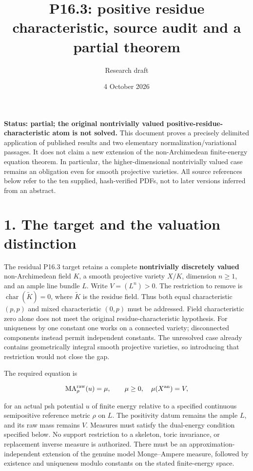 \documentclass[
  11pt,
]{article}
\title{P16.3: positive residue characteristic, source audit and a
partial theorem}
\author{Research draft}
\date{4 October 2026}
\begin{document}
\maketitle

\textbf{Status: partial; the original nontrivially valued
positive-residue-characteristic atom is not solved.} This document
proves a precisely delimited application of published results and two
elementary normalization/variational passages. It does not claim a new
extension of the non-Archimedean finite-energy equation theorem. In
particular, the higher-dimensional nontrivially valued case remains an
obligation even for smooth projective varieties. All source references
below refer to the ten supplied, hash-verified PDFs, not to later
versions inferred from an abstract.

\section{1. The target and the valuation
distinction}\label{the-target-and-the-valuation-distinction}

The residual P16.3 target retains a complete \textbf{nontrivially
discretely valued} non-Archimedean field \(K\), a smooth projective
variety \(X/K\), dimension \(n\geq 1\), and an ample line bundle \(L\).
Write \(V=(L^n)>0\). The restriction to remove is
\(\operatorname{char}(\widetilde K)=0\), where \(\widetilde K\) is the
residue field. Thus both equal characteristic \((p,p)\) and mixed
characteristic \((0,p)\) must be addressed. Field characteristic zero
alone does not meet the original residue-characteristic hypothesis. For
uniqueness by one constant one works on a connected variety;
disconnected components instead permit independent constants. The
unresolved case already contains geometrically integral smooth
projective varieties, so introducing that restriction would not close
the gap.

The required equation is

\[\operatorname{MA}^{\rm raw}_{\rho}(u)=\mu,\qquad \mu\geq 0,\quad \mu(X^{\rm an})=V,\]

for an actual psh potential \(u\) of finite energy relative to a
specified continuous semipositive reference metric \(\rho\) on \(L\).
The positivity datum remains the ample \(L\), and its raw mass remains
\(V\). Measures must satisfy the dual-energy condition specified below.
No support restriction to a skeleton, toric invariance, or replacement
inverse measure is authorized. There must be an
approximation-independent extension of the genuine model Monge--Ampere
measure, followed by existence and uniqueness modulo constants on the
stated finite-energy space.
\end{document}
